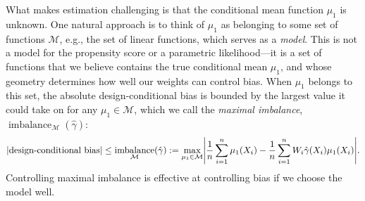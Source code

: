 \documentclass{article}
\DeclarePairedDelimiter\abs{\lvert}{\rvert}
\theoremstyle{definition}
\newcommand{\calM}{\ensuremath{\mathcal{M}}}
\DeclareMathOperator{\imbalance}{imbalance}
\newcommand{\hgamma}{\ensuremath{\hat\gamma}}
\newcommand{\model}{\mathcal{M}}
\newcommand{\<}{\langle}
\renewcommand{\>}{\rangle}
\newcommand\cmnt[2]{\;
{\textcolor{red}{[{\em #1 --- #2}] \;}
}}
\newcommand\avi[1]{\cmnt{#1}{Avi}}
\begin{document}
What makes estimation challenging is that the conditional mean function $\mu_1$ is unknown. One natural approach is to think of $\mu_1$ as belonging to some set of functions $\model$, e.g., the set of linear functions, which serves as a \emph{model}. This is not a model for the propensity score or a parametric likelihood---it is a set of functions that we believe contains the true conditional mean $\mu_1$, and whose geometry determines how well our weights can control bias.
When $\mu_1$ belongs to this set, the absolute design-conditional bias
is bounded by the largest value it could take on for any $\mu_1 \in \model$, which we call the \emph{maximal imbalance}, $\imbalance_\model(\hgamma)$:
\begin{equation}
    \label{eq:bias}
    \abs*{\text{design-conditional bias}} \leq \imbalance_{\calM}(\hgamma) := \max_{\mu_1 \in \calM} \abs*{\frac{1}{n}\sum_{i=1}^n \mu_1(X_i) - \frac{1}{n}\sum_{i=1}^n W_i \hgamma(X_i) \mu_1(X_i) }.
\end{equation}
Controlling maximal imbalance is effective at controlling bias if we choose the model well.

\end{document}
